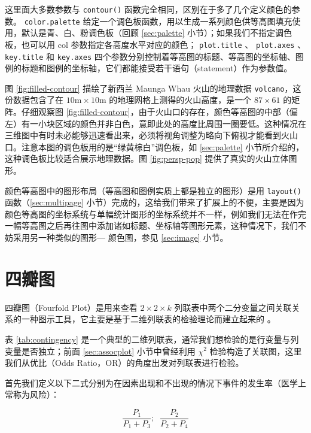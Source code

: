 \documentclass[
  b5paper,
  UTF8,twoside]{book}
\begin{document}
这里面大多数参数与 \texttt{contour()} 函数完全相同，区别在于多了几个定义颜色的参数。 \texttt{color.palette} 给定一个调色板函数，用以生成一系列颜色供等高图填充使用，默认是青、白、粉调色板（回顾 \ref{sec:palette} 小节）；如果我们不指定调色板，也可以用 col 参数指定各高度水平对应的颜色； \texttt{plot.title} 、 \texttt{plot.axes} 、 \texttt{key.title} 和 \texttt{key.axes} 四个参数分别控制着等高图的标题、等高图的坐标轴、图例的标题和图例的坐标轴，它们都能接受若干语句（statement）作为参数值。

图 \ref{fig:filled-contour}
描绘了新西兰 Maunga Whau 火山的地理数据 \texttt{volcano}，这份数据包含了在 \(10\mathrm{m}\times10\mathrm{m}\) 的地理网格上测得的火山高度，是一个 \(87\times61\) 的矩阵。仔细观察图 \ref{fig:filled-contour}，由于火山口的存在，颜色等高图的中部（偏左）有一小块区域的颜色并非白色，意即此处的高度比周围一圈要低。这种情况在三维图中有时未必能够迅速看出来，必须将视角调整为略向下俯视才能看到火山口。注意本图的调色板用的是``绿黄棕白''调色板，如 \ref{sec:palette} 小节所介绍的，这种调色板比较适合展示地理数据。图 \ref{fig:persp-pop}
提供了真实的火山立体图形。

颜色等高图中的图形布局（等高图和图例实质上都是独立的图形）是用 \texttt{layout()} 函数（\ref{sec:multipage} 小节）完成的，这给我们带来了扩展上的不便，主要是因为颜色等高图的坐标系统与单幅统计图形的坐标系统并不一样，例如我们无法在作完一幅等高图之后再往图中添加诸如标题、坐标轴等图形元素，这种情况下，我们不妨采用另一种类似的图形--- 颜色图，参见 \ref{sec:image} 小节。

\hypertarget{sec:fourfoldplot}{%
\section{四瓣图}\label{sec:fourfoldplot}}

四瓣图（Fourfold Plot）是用来查看 \(2\times2\times k\) 列联表中两个二分变量之间关联关系的一种图示工具，它主要是基于二维列联表的检验理论而建立起来的 \citep{Friendly94}。

表 \ref{tab:contingency} 是一个典型的二维列联表，通常我们想检验的是行变量与列变量是否独立；前面 \ref{sec:assocplot} 小节中曾经利用 \(\chi^{2}\) 检验构造了关联图，这里我们从优比（Odds Ratio，OR）的角度出发对列联表进行检验。

首先我们定义以下二式分别为在因素出现和不出现的情况下事件的发生率（医学上常称为风险）：

\begin{equation} 
\frac{P_{1}}{P_{1}+P_{3}};\;\;\frac{P_{2}}{P_{2}+P_{4}}
\label{eq:OR1}
\end{equation}
\end{document}
